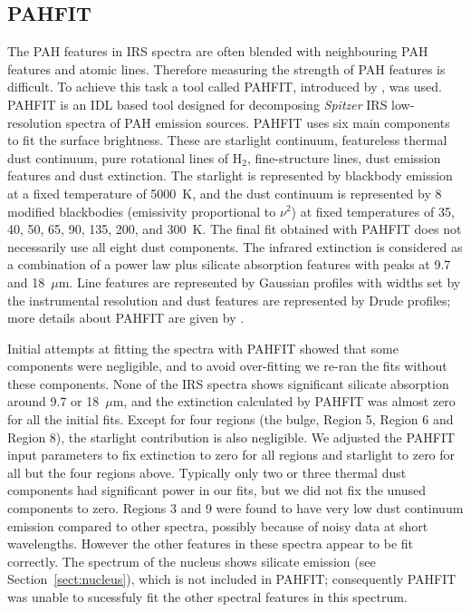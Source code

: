 \subsection{PAHFIT}
\label{sect:pahfit}
The PAH features in  IRS spectra are often blended with neighbouring PAH features and atomic lines. 
Therefore measuring the strength of PAH features is difficult.  To achieve this task a tool called PAHFIT, introduced by \citet{Smith:2007lr}, was used. 
PAHFIT is an IDL  based tool designed for decomposing {\em Spitzer} IRS low-resolution spectra of PAH emission sources.
PAHFIT uses six main components to fit the surface brightness. These are starlight continuum, featureless thermal dust continuum, 
pure rotational lines of H$_2$, fine-structure lines, dust emission features and dust extinction. The starlight is represented by  blackbody 
emission at a fixed temperature of 5000~K, and the dust continuum is represented by 8 modified blackbodies (emissivity proportional to $\nu^2$)  
at fixed temperatures of 35, 40, 50, 65, 90, 135, 200, and 300~K. The final fit obtained with PAHFIT does not necessarily use
all eight dust components.
The infrared extinction is considered as a combination of a power law plus silicate absorption features with peaks at 9.7 and 18~$\mu$m. 
Line features are represented by Gaussian profiles with widths set by the instrumental resolution
and dust features are represented by Drude profiles; more details about PAHFIT are given by \citet{Smith:2007lr}.


Initial attempts at fitting the spectra with PAHFIT showed that some components were negligible, and
to avoid over-fitting we re-ran the fits without these components.
None of the IRS spectra shows significant silicate absorption around 9.7 or 18~$\mu$m, and the extinction calculated by PAHFIT 
was almost zero for all the initial fits. Except for four regions (the bulge, Region 5, Region 6 and Region 8),
the starlight contribution is also negligible.
We adjusted the PAHFIT input parameters to fix extinction to zero for all regions and starlight to zero for all but the four regions above.
Typically only two or three thermal dust components had significant power in our fits, but we did not fix the unused components to zero.
Regions 3 and 9 were found to have very low dust continuum emission compared to other spectra,
possibly because of noisy data at short wavelengths. However the other features in these spectra appear to
be fit correctly.
The spectrum of the nucleus shows silicate emission (see Section~\ref{sect:nucleus}), which is not included in PAHFIT;  
consequently PAHFIT was unable to sucessfuly fit the other spectral features in this spectrum.

